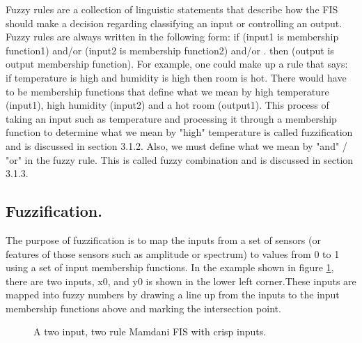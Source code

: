 Fuzzy rules are a collection of linguistic
statements that describe how the FIS should make a decision regarding
classifying an input or controlling an output. Fuzzy rules are always written in
the following form: if (input1 is membership function1) and/or (input2 is
membership function2) and/or . then (output is output membership function). For
example, one could make up a rule that says: if temperature is high and humidity
is high then room is hot. There would have to be membership functions that
define what we mean by high temperature (input1), high humidity (input2) and a
hot room (output1). This process of taking an input such as temperature and
processing it through a membership function to determine what we mean by "high"
temperature is called fuzzification and is discussed in section 3.1.2. Also, we
must define what we mean by "and" / "or" in the fuzzy rule. This is called fuzzy
combination and is discussed in section 3.1.3.

\subsection{Fuzzification.}

The purpose of fuzzification is to map the inputs from a set of sensors (or
features of those sensors such as amplitude or spectrum) to values from 0 to 1
using a set of input membership functions. In the example shown in figure \ref{fig:mamdaniFis},
there are two inputs, x0, and y0 is shown in the lower left corner.These inputs
are mapped into fuzzy numbers by drawing a line up from the inputs to the input
membership functions above and marking the intersection point. 

\begin{figure}
\captionsetup{justification=centering,margin=2cm}
\centering
\setlength\fboxsep{0pt}
\setlength\fboxrule{0.7pt}
\caption{A two input, two rule Mamdani FIS with crisp inputs.}
\label{fig:mamdaniFis}       
\end{figure}

